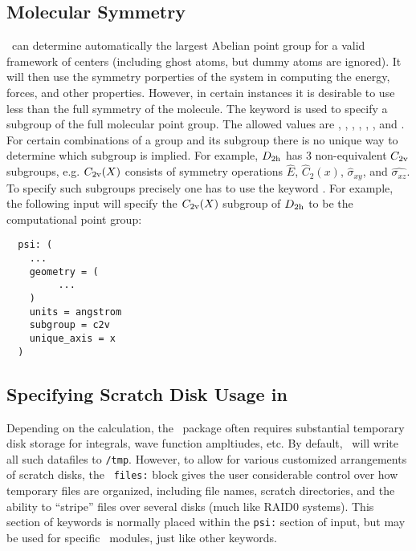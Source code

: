 \subsection{Molecular Symmetry}
\PSIthree\ can determine automatically the largest Abelian point group
for a valid framework of centers (including ghost atoms, but dummy
atoms are ignored).  It will then use the symmetry porperties of the
system in computing the energy, forces, and other properties.
However, in certain instances it is desirable to use less than the
full symmetry of the molecule. The keyword  is used
to specify a subgroup of the full molecular point group. The allowed
values are , , , ,
, , and . For certain combinations
of a group and its subgroup there is no unique way to determine which
subgroup is implied. For example, $D_{\rm 2h}$ has 3 non-equivalent
$C_{\rm 2v}$ subgroups, e.g. $C_{\rm 2v}(X)$ consists of symmetry
operations $\hat{E}$, $\hat{C}_2(x)$, $\hat{\sigma}_{xy}$, and
$\hat{\sigma_{xz}}$.  To specify such subgroups precisely one has to
use the keyword .  For example, the following
input will specify the $C_{\rm 2v}(X)$ subgroup of $D_{\rm 2h}$ to be
the computational point group:
\begin{verbatim}
  psi: (
    ...
    geometry = (
         ...
    )
    units = angstrom
    subgroup = c2v
    unique_axis = x
  )
\end{verbatim}

\subsection{Specifying Scratch Disk Usage in \PSIthree} \label{scratchfiles}

Depending on the calculation, the \PSIthree\ package often requires
substantial temporary disk storage for integrals, wave function
ampltiudes, etc.  By default, \PSIthree\ will write all such datafiles
to {\tt /tmp}.  However, to allow for various customized arrangements
of scratch disks, the \PSIthree\ {\tt files:} block gives the user
considerable control over how temporary files are organized, including
file names, scratch directories, and the ability to ``stripe'' files
over several disks (much like RAID0 systems).  This section of
keywords is normally placed within the {\tt psi:} section of input,
but may be used for specific \PSIthree\ modules, just like other
keywords.


